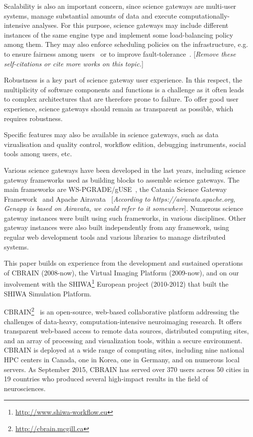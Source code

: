 \documentclass[preprint,3p,twocolumn]{elsarticle}
\newcommand{\todo}[1]{\color{blue}\xspace[\emph{#1}]\xspace\color{black}}
\begin{document}
Scalability is also an important concern, since science gateways are
multi-user systems, manage substantial amounts of data and execute
computationally-intensive analyses. For this purpose, science gateways
may include different instances of the same engine type and implement
some load-balancing policy among them. They may also enforce
scheduling policies on the infrastructure, e.g. to ensure fairness
among users~\cite{FERR-14} or to improve
fault-tolerance~\cite{FERR-13}. \todo{Remove these self-citations or
  cite more works on this topic.}

Robustness is a key part of science gateway user experience. In this
respect, the multiplicity of software components and functions is a
challenge as it often leads to complex architectures that are
therefore prone to failure. To offer good user experience, science
gateways should remain as transparent as possible, which requires
robustness. 

Specific features may also be available in science
gateways, such as data vizualisation and quality control, workflow
edition, debugging instruments, social tools among users, etc.

Various science gateways have been developed in the last years,
including science gateway frameworks used as building blocks to
assemble science gateways. The main frameworks are
WS-PGRADE/gUSE~\cite{Kacsuk2012}, the Catania Science Gateway
Framework~\cite{Ardizzone2012} and Apache
Airavata~\cite{marru2011apache} \todo{According to
  https://airavata.apache.org, Genapp is based on Airavata, we could
  refer to it somewhere}. Numerous science gateway instances were
built using such frameworks, in various disciplines. Other gateway
instances were also built independently from any framework, using
regular web development tools and various libraries to manage
distributed systems.

This paper builds on experience from the development and sustained
operations of CBRAIN (2008-now), the Virtual Imaging Platform
(2009-now), and on our involvement with the
SHIWA\footnote{\url{http://www.shiwa-workflow.eu}} European project
(2010-2012) that built the SHIWA Simulation Platform.

CBRAIN\footnote{\url{http://cbrain.mcgill.ca}}~\cite{SHER-14} is an
open-source, web-based collaborative platform addressing the
challenges of data-heavy, computation-intensive neuroimaging
research. It offers transparent web-based access to remote data
sources, distributed computing sites, and an array of processing and
visualization tools, within a secure environment. CBRAIN is deployed
at a wide range of computing sites, including nine national HPC
centers in Canada, one in Korea, one in Germany, and on numerous local
servers. As September 2015, CBRAIN has served over 370 users across 50
cities in 19 countries who produced several high-impact results in the
field of neurosciences.
\end{document}
